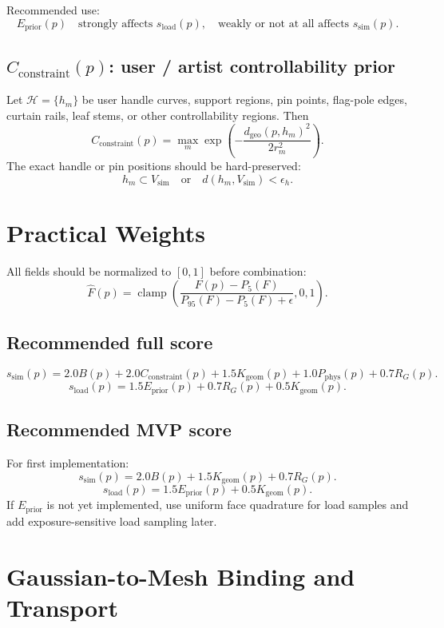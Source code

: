 \documentclass[11pt,a4paper]{article}
\newcommand{\clamp}{\operatorname{clamp}}
\begin{document}
Recommended use:
\[
E_{\mathrm{prior}}(p)\quad\text{strongly affects }s_{\mathrm{load}}(p),\quad\text{weakly or not at all affects }s_{\mathrm{sim}}(p).
\]

\subsection{$C_{\mathrm{constraint}}(p)$: user / artist controllability prior}

Let $\mathcal{H}=\{h_m\}$ be user handle curves, support regions, pin points, flag-pole edges, curtain rails, leaf stems, or other controllability regions. Then
\[
C_{\mathrm{constraint}}(p)=
\max_m\exp\left(-\frac{d_{\mathrm{geo}}(p,h_m)^2}{2r_m^2}\right).
\]
The exact handle or pin positions should be hard-preserved:
\[
h_m\subset V_{\mathrm{sim}}\quad\text{or}\quad d(h_m,V_{\mathrm{sim}})<\epsilon_h.
\]

\section{Practical Weights}

All fields should be normalized to $[0,1]$ before combination:
\[
\widehat{F}(p)=
\clamp\left(\frac{F(p)-P_5(F)}{P_{95}(F)-P_5(F)+\epsilon},0,1\right).
\]

\subsection{Recommended full score}

\[
s_{\mathrm{sim}}(p)=
2.0B(p)+2.0C_{\mathrm{constraint}}(p)+1.5K_{\mathrm{geom}}(p)+1.0P_{\mathrm{phys}}(p)+0.7R_G(p).
\]
\[
s_{\mathrm{load}}(p)=
1.5E_{\mathrm{prior}}(p)+0.7R_G(p)+0.5K_{\mathrm{geom}}(p).
\]

\subsection{Recommended MVP score}

For first implementation:
\[
s_{\mathrm{sim}}(p)=2.0B(p)+1.5K_{\mathrm{geom}}(p)+0.7R_G(p).
\]
\[
s_{\mathrm{load}}(p)=1.5E_{\mathrm{prior}}(p)+0.5K_{\mathrm{geom}}(p).
\]
If $E_{\mathrm{prior}}$ is not yet implemented, use uniform face quadrature for load samples and add exposure-sensitive load sampling later.

\section{Gaussian-to-Mesh Binding and Transport}
\end{document}
